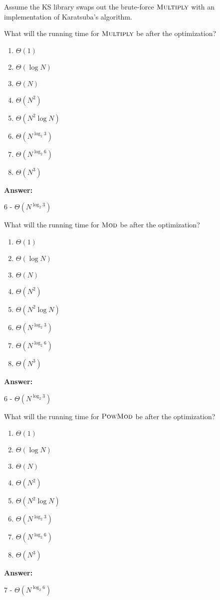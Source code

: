 \documentclass[12pt,twoside]{article}
\newcommand{\answer}{
 \par\medskip
 \textbf{Answer:}
}
\newcommand{\answerIm}{ \answer
6 - $\Theta(N^{\log_2 3})$
}
\newcommand{\answerIn}{ \answer
6 - $\Theta(N^{\log_2 3})$
}
\newcommand{\answerIo}{ \answer
7 - $\Theta(N^{\log_2 6})$
}
\begin{document}
\begin{problems}
\begin{problemparts}
\end{problemparts}

Assume the KS library swaps out the brute-force $\textnormal{\scshape Multiply}$ with an
implementation of Karatsuba's algorithm.

\begin{problemparts}
\problempart {} What will the running time for $\textnormal{\scshape Multiply}$ be
after the optimization?
\begin{enumerate}
  \item $\Theta(1)$
  \item $\Theta(\log N)$
  \item $\Theta(N)$
  \item $\Theta(N^2)$
  \item $\Theta(N^2 \log N)$
  \item $\Theta(N^{\log_2 3})$
  \item $\Theta(N^{\log_2 6})$
  \item $\Theta(N^3)$
\end{enumerate}
\answerIm

\problempart {} What will the running time for $\textnormal{\scshape Mod}$ be after
the optimization?
\begin{enumerate}
  \item $\Theta(1)$
  \item $\Theta(\log N)$
  \item $\Theta(N)$
  \item $\Theta(N^2)$
  \item $\Theta(N^2 \log N)$
  \item $\Theta(N^{\log_2 3})$
  \item $\Theta(N^{\log_2 6})$
  \item $\Theta(N^3)$
\end{enumerate}
\answerIn

\problempart {} What will the running time for $\textnormal{\scshape PowMod}$ be after
the optimization?
\begin{enumerate}
  \item $\Theta(1)$
  \item $\Theta(\log N)$
  \item $\Theta(N)$
  \item $\Theta(N^2)$
  \item $\Theta(N^2 \log N)$
  \item $\Theta(N^{\log_2 3})$
  \item $\Theta(N^{\log_2 6})$
  \item $\Theta(N^3)$
\end{enumerate}
\answerIo


\end{problemparts}
\end{problems}
\end{document}

